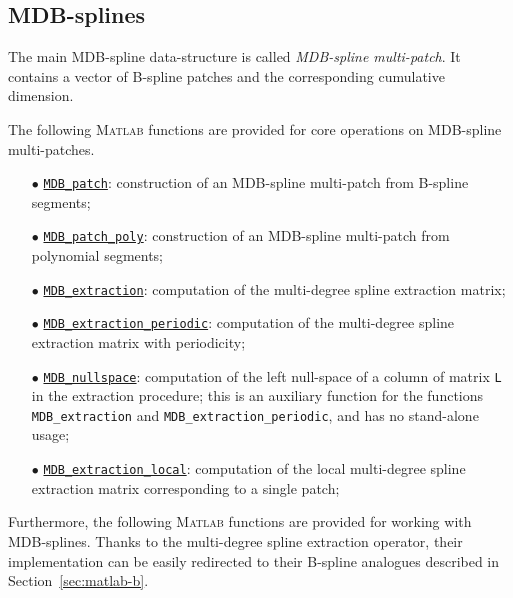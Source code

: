 \documentclass[10pt]{./acmtrans2e}
\newcommand{\Matlab}{\textsc{Matlab} }
\begin{document}
\subsection{MDB-splines}\label{sec:matlab-mdb}

The main MDB-spline data-structure is called \emph{MDB-spline multi-patch}. It contains a vector of B-spline patches and the corresponding cumulative dimension. 

The following \Matlab functions are provided for core operations on MDB-spline multi-patches.
\begin{itemize}
  \item[$\bullet$] \hyperref[sec:matlab-mdb-patch]{\texttt{MDB\_patch}}: 
     construction of an MDB-spline multi-patch from B-spline segments;
  \item[$\bullet$] \hyperref[sec:matlab-mdb-patch-poly]{\texttt{MDB\_patch\_poly}}: 
    construction of an MDB-spline multi-patch from polynomial segments; 
  \item[$\bullet$] \hyperref[sec:matlab-mdb-extraction]{\texttt{MDB\_extraction}}: 
    computation of the multi-degree spline extraction matrix;
  \item[$\bullet$] \hyperref[sec:matlab-mdb-extraction-periodic]{\texttt{MDB\_extraction\_periodic}}: 
    computation of the multi-degree spline extraction matrix with periodicity;
  \item[$\bullet$] \hyperref[sec:matlab-mdb-nullspace]{\texttt{MDB\_nullspace}}: 
    computation of the left null-space of a column of matrix \texttt{L} in the extraction procedure;
    this is an auxiliary function for the functions \texttt{MDB\_extraction} and \texttt{MDB\_extraction\_periodic}, and has no stand-alone usage;
  \item[$\bullet$] \hyperref[sec:matlab-mdb-extraction-local]{\texttt{MDB\_extraction\_local}}: 
    computation of the local multi-degree spline extraction matrix corresponding to a single patch;
\end{itemize}
Furthermore, the following \Matlab functions are provided for working with MDB-splines. Thanks to the multi-degree spline extraction operator, their implementation can be easily redirected to their B-spline analogues described in Section~\ref{sec:matlab-b}.
\end{document}
